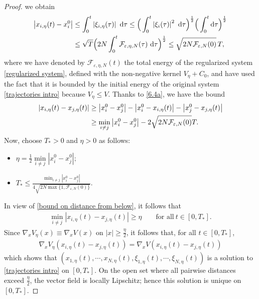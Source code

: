 \documentclass[11pt,reqno]{amsart}
\numberwithin{equation}{section}
\def\dd{{\rm d}}
\begin{document}
\begin{proof}
we obtain 
\begin{align}
\left\vert x_{i,\eta}(t)-x_{i}^{0}\right\vert 
&\leq \int_{0}^{t}\left\vert \xi_{i,\eta}(\tau)\right\vert\ \dd \tau  
\leq \Big(\int_{0}^{t}\left\vert \xi_{i}(\tau)\right\vert^{2}\ \dd\tau\Big)^{\frac{1}{2}}
\Big(\int_{0}^{t} \dd \tau\Big)^{\frac{1}{2}}\notag\\
&\leq \sqrt{T}\Big(2N\int_{0}^{t}\mathcal{F}_{\varepsilon,\eta,N}(\tau)\ \dd \tau\Big)^{\frac{1}{2}}
\leq \sqrt{2N\mathcal{F}_{\varepsilon,N}(0)}\,T, \label{6.4a}    
\end{align}
where we have denoted by $\mathcal{F}_{\varepsilon,\eta,N}(t)$ 
the total energy of the regularized system \eqref{regularized system}, defined with the non-negative kernel $V_\eta+C_0$,
and have used the fact that it is bounded by the initial energy of the original 
system \eqref{trajectories intro} because $V_{\eta}\leq V$. 
Thanks to \eqref{6.4a},
we have the bound 
\begin{align}
\left\vert x_{i,\eta}(t)-x_{j,\eta}(t)\right\vert&\geq \left\vert x_{i}^{0}-x_{j}^{0}\right\vert-\left\vert x_{i}^{0}-x_{i,\eta}(t)\right\vert-\left\vert x_{j}^{0}-x_{j,\eta}(t)\right\vert \notag\\
&\geq \underset{i\neq j}{\min}\left\vert x_{i}^{0}-x_{j}^{0}\right\vert-2\sqrt{2N\mathcal{F}_{\varepsilon,N}(0)}T.  \label{bound on distance from below}\end{align}
Now,  choose $T_{\ast}>0$ and $\eta>0$ as follows:  
\begin{itemize}
\item[{\rm(a)}]$\eta=\frac{1}{2}\underset{i\neq j}{\min}\left\vert x_{i}^{0}-x_{j}^{0}\right\vert;$
\item[{\rm(b)}] $T_{\ast}\leq \frac{\min_{i\neq j}\left\vert x_{i}^{0}-x_{j}^{0}\right\vert }{4\sqrt{2N\max\{1,\mathcal{F}_{\varepsilon,N}(0)\}}}.$  
\end{itemize}
In view of \eqref{bound on distance from below}, it follows that 
\begin{align*}
\min_{i\neq j}\left\vert x_{i,\eta}(t)-x_{j,\eta}(t)\right\vert\geq\eta\qquad \mbox{for all}\ t\in [0,T_{\ast}].      
\end{align*}
Since $\nabla_{x}V_{\eta}(x)\equiv\nabla_{x}V(x)$ on $\left\vert x\right\vert \geq \frac{\eta}{2}$, 
it follows that, for all $t\in [0,T_{\ast}]$,
\begin{align*}
\nabla_{x}V_{\eta}(x_{i,\eta}(t)-x_{j,\eta}(t))=\nabla_{x}V(x_{i,\eta}(t)-x_{j,\eta}(t))    
\end{align*}
which shows that 
$(x_{1,\eta}(t),\cdots\!,x_{N,\eta}(t),\xi_{1,\eta}(t),\cdots\!,\xi_{N,\eta}(t))$ is a solution to \eqref{trajectories intro} on $[0,T_{\ast}]$. On the open set where all pairwise distances exceed $\frac{\eta}{2}$, the vector field is locally Lipschitz; hence this solution is unique on $[0,T_*]$.
\end{proof}
\end{document}

